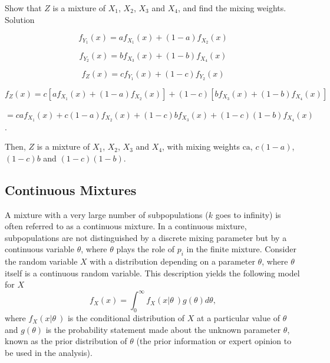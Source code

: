 \documentclass[]{book}
\theoremstyle{definition}
\theoremstyle{definition}
\theoremstyle{definition}
\theoremstyle{remark}
\begin{document}
Show that \(Z\) is a mixture of \(X_{1}\), \(X_{2}\), \(X_{3}\) and
\(X_{4}\), and find the mixing weights. Solution

\[f_{Y_{1}}\left( x \right) = af_{X_{1}}\left( x \right) + \left( 1 - a \right)f_{X_{2}}\left( x \right)\]

\[f_{Y_{2}}\left( x \right) = bf_{X_{3}}\left( x \right) + \left( 1 - b \right)f_{X_{4}}\left( x \right)\]

\[f_{Z}\left( x \right) = cf_{Y_{1}}\left( x \right) + \left( 1 - c \right)f_{Y_{2}}\left( x \right)\]

\[f_{Z}\left( x \right) = c\left\lbrack af_{X_{1}}\left( x \right) + \left( 1 - a \right)f_{X_{2}}\left( x \right) \right\rbrack + \left( 1 - c \right)\left\lbrack bf_{X_{3}}\left( x \right) + \left( 1 - b \right)f_{X_{4}}\left( x \right) \right\rbrack\]

\(= caf_{X_{1}}\left( x \right) + c\left( 1 - a \right)f_{X_{2}}\left( x \right) + \left( 1 - c \right)bf_{X_{3}}\left( x \right) + (1 - c)\left( 1 - b \right)f_{X_{4}}\left( x \right)\).

Then, \(Z\) is a mixture of \(X_{1}\), \(X_{2}\), \(X_{3}\) and
\(X_{4}\), with mixing weights \(\text{ca}\), \(c\left( 1 - a \right)\),
\(\left( 1 - c \right)b\) and \((1 - c)\left( 1 - b \right)\).

\subsection{Continuous Mixtures}\label{continuous-mixtures}

A mixture with a very large number of subpopulations (\(k\) goes to
infinity) is often referred to as a continuous mixture. In a continuous
mixture, subpopulations are not distinguished by a discrete mixing
parameter but by a continuous variable \(\theta\), where \(\theta\)
plays the role of \(p_{i}\) in the finite mixture. Consider the random
variable \(X\) with a distribution depending on a parameter \(\theta\),
where \(\theta\) itself is a continuous random variable. This
description yields the following model for \(X\)
\[f_{X}\left( x \right) = \int_{0}^{\infty}{f_{X}\left( x\left| \theta \right.\  \right)g\left( \theta \right)} d \theta ,\]
where \(f_{X}\left( x\left| \theta \right.\  \right)\) is the
conditional distribution of \(X\) at a particular value of \(\theta\)
and \(g\left( \theta \right)\) is the probability statement made about
the unknown parameter \(\theta\), known as the prior distribution of
\(\theta\) (the prior information or expert opinion to be used in the
analysis).
\end{document}
